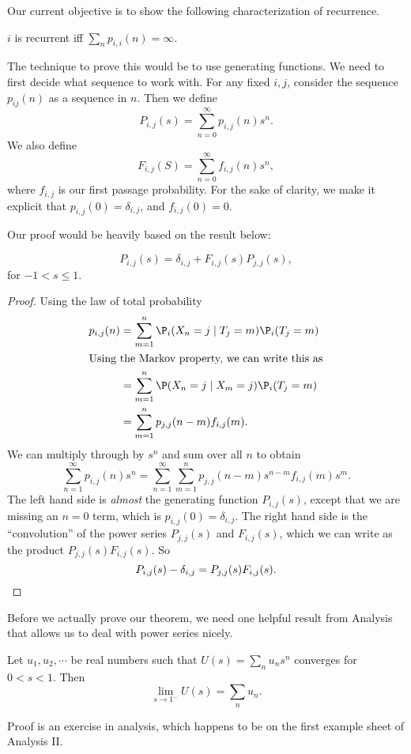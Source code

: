 \documentclass[a4paper]{article}
\begin{document}
Our current objective is to show the following characterization of recurrence.
\begin{thm}
  $i$ is recurrent iff $\sum_n p_{i, i}(n) = \infty$.
\end{thm}
The technique to prove this would be to use generating functions. We need to first decide what sequence to work with. For any fixed $i, j$, consider the sequence $p_{ij}(n)$ as a sequence in $n$. Then we define
\[
  P_{i, j}(s) = \sum_{n = 0}^\infty p_{i, j}(n) s^n.
\]
We also define
\[
  F_{i, j}(S) = \sum_{n = 0}^\infty f_{i, j}(n) s^n,
\]
where $f_{i, j}$ is our first passage probability. For the sake of clarity, we make it explicit that $p_{i, j}(0) = \delta_{i, j}$, and $f_{i, j}(0) = 0$.

Our proof would be heavily based on the result below:
\begin{thm}
  \[
    P_{i, j}(s) = \delta_{i, j} + F_{i, j}(s)P_{j, j}(s),
  \]
  for $-1 < s \leq 1$.
\end{thm}

\begin{proof}
  Using the law of total probability
  \begin{align*}
    p_{i, j}(n) &= \sum_{m = 1}^n \P_i(X_n = j\mid T_j = m) \P_i(T_j = m) \\
    \intertext{Using the Markov property, we can write this as}
    &= \sum_{m = 1}^n \P(X_n = j\mid X_m = j) \P_i(T_j = m)\\
    &= \sum_{m = 1}^n p_{j, j}(n - m) f_{i, j}(m).
  \end{align*}
  We can multiply through by $s^n$ and sum over all $n$ to obtain
  \[
    \sum_{n = 1}^\infty p_{i, j}(n) s^n = \sum_{n = 1}^\infty \sum_{m = 1}^n p_{j, j}(n - m)s^{n - m} f_{i, j}(m)s^m.
  \]
  The left hand side is \emph{almost} the generating function $P_{i, j}(s)$, except that we are missing an $n = 0$ term, which is $p_{i, j}(0) = \delta_{i, j}$. The right hand side is the ``convolution'' of the power series $P_{j, j}(s)$ and $F_{i, j}(s)$, which we can write as the product $P_{j, j}(s) F_{i, j}(s)$. So
  \[
    P_{i, j}(s) - \delta_{i, j} = P_{j, j}(s) F_{i, j}(s).\qedhere
  \]
\end{proof}

Before we actually prove our theorem, we need one helpful result from Analysis that allows us to deal with power series nicely.
\begin{lemma}
  Let $u_1, u_2, \cdots$ be real numbers such that $U(s) = \sum_{n} u_n s^n$ converges for $0 < s < 1$. Then
  \[
    \lim_{s\to 1^-} U(s) = \sum_n u_n.
  \]
\end{lemma}
Proof is an exercise in analysis, which happens to be on the first example sheet of Analysis II.
\end{document}
